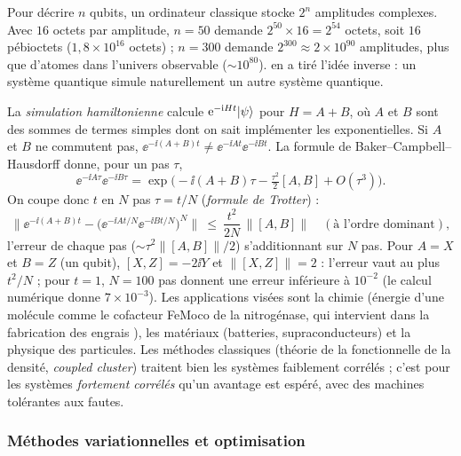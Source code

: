 Pour décrire $n$ qubits, un ordinateur classique stocke $2^n$ amplitudes complexes. Avec $16$ octets par amplitude, $n=50$
demande $2^{50}\times16=2^{54}$ octets, soit $16$ pébioctets ($1{,}8\times10^{16}$ octets) ; $n=300$ demande $2^{300}\approx2\times10^{90}$
amplitudes, plus que d'atomes dans l'univers observable ($\sim10^{80}$). \textcite{feynman1982} en a tiré l'idée
inverse : un système quantique simule naturellement un autre système quantique.

La \emph{simulation hamiltonienne} calcule $\mathrm{e}^{-\mathrm{i} Ht}|\psi\rangle$ pour $H=A+B$, où $A$ et $B$ sont des sommes de termes simples dont on sait implémenter les exponentielles.
Si $A$ et $B$ ne commutent pas, $\ee^{-\ii(A+B)t}\neq\ee^{-\ii At}\ee^{-\ii Bt}$. La formule de Baker--Campbell--Hausdorff donne, pour un pas $\tau$,
\[
  \ee^{-\ii A\tau}\ee^{-\ii B\tau}=\exp\!\Big(-\ii(A+B)\tau-\tfrac{\tau^2}{2}[A,B]+O(\tau^3)\Big).
\]
On coupe donc $t$ en $N$ pas $\tau=t/N$ (\emph{formule de Trotter}) :
\[
  \Big\|\ee^{-\ii(A+B)t}-\big(\ee^{-\ii At/N}\ee^{-\ii Bt/N}\big)^N\Big\|\ \leq\ \frac{t^2}{2N}\,\big\|[A,B]\big\|\quad(\text{à l'ordre dominant}),
\]
l'erreur de chaque pas ($\sim\tau^2\|[A,B]\|/2$) s'additionnant sur $N$ pas. Pour $A=X$ et $B=Z$ (un qubit), $[X,Z]=-2\ii Y$ et
$\|[X,Z]\|=2$ : l'erreur vaut au plus $t^2/N$ ; pour $t=1$, $N=100$ pas donnent une erreur inférieure à $10^{-2}$ (le calcul numérique donne $7\times10^{-3}$). Les applications visées sont la chimie
(énergie d'une molécule comme le cofacteur FeMoco de la nitrogénase, qui intervient dans la fabrication des engrais \parencite{reiher2017}),
les matériaux (batteries, supraconducteurs) et la physique des particules. Les méthodes classiques (théorie de la fonctionnelle de
la densité, \emph{coupled cluster}) traitent bien les systèmes faiblement corrélés ; c'est pour les systèmes \emph{fortement
corrélés} qu'un avantage est espéré, avec des machines tolérantes aux fautes.

\subsubsection{Méthodes variationnelles et optimisation}


